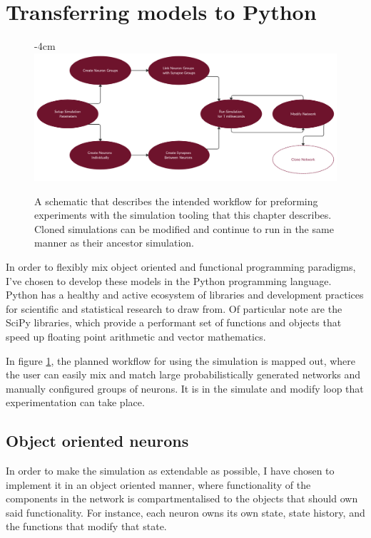 
\section{Transferring models to Python}

\begin{figure}[h]
    \centering
    \addtolength{\leftskip} {-4cm}
    \addtolength{\rightskip}{-4cm}
    \includegraphics[width=1.3\linewidth]{figures/images/workflow.png}
    \caption[Workflow of the project simulation tooling]{A schematic that describes the intended workflow for preforming experiments with the simulation tooling that this chapter describes. Cloned simulations can be modified and continue to run in the same manner as their ancestor simulation.}
    \label{fig:workflow}
\end{figure}

In order to flexibly mix object oriented and functional programming paradigms,
I've chosen to develop these models in the Python programming language. Python has a healthy and active ecosystem of libraries and development practices
for scientific and statistical research to draw from. Of particular note are the
SciPy libraries, which provide a performant set of functions and objects that
speed up floating point arithmetic and vector mathematics. 

In figure \ref{fig:workflow}, the planned workflow for using the simulation is
mapped out, where the user can easily mix and match large probabilistically
generated networks and manually configured groups of neurons. It is in the
simulate and modify loop that experimentation can take place.

\subsection{Object oriented neurons}

In order to make the simulation as extendable as possible, I have chosen to
implement it in an object oriented manner, where functionality of the components
in the network is compartmentalised to the objects that should own said
functionality. For instance, each neuron owns its own state, state history, and
the functions that modify that state.

